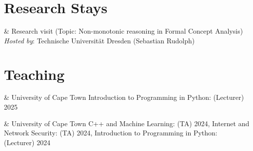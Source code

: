 \documentclass[10pt,a4paper]{article}
\begin{document}

\section{Research Stays}

\begin{EntriesTableYear}
	  &
	Research visit (Topic: Non-monotonic reasoning in Formal Concept Analysis)\newline
	\emph{Hosted by}: Technische Universität Dresden (Sebastian Rudolph)
\end{EntriesTableYear}





\section{Teaching}

\begin{EntriesTableYear}
	 & University of Cape Town\newline
	Introduction to Programming in Python: (Lecturer) 2025
\end{EntriesTableYear}

\begin{EntriesTableYear}
	 & University of Cape Town\newline
	C++ and Machine Learning: (TA) 2024, \newline
	Internet and Network Security: (TA) 2024, \newline
	Introduction to Programming in Python: (Lecturer) 2024
\end{EntriesTableYear}
\end{document}
